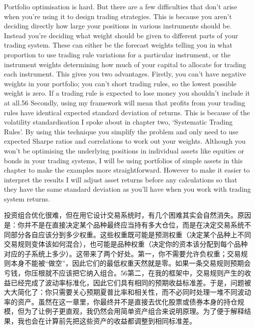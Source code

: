 
\begin{englishblock} Portfolio optimisation is hard. But there are a few difficulties that don't arise when you're using it to design trading strategies. This is because you aren't deciding directly how large your positions in various instruments should be. Instead you're deciding what weight should be given to different parts of your trading system. These can either be the forecast weights telling you in what proportion to use trading rule variations for a particular instrument, or the instrument weights determining how much of your capital to allocate for trading each instrument. This gives you two advantages. Firstly, you can't have negative weights in your portfolio; you can't short trading rules, so the lowest possible weight is zero. If a trading rule is expected to lose money you shouldn't include it at all.56 Secondly, using my framework will mean that profits from your trading rules have identical expected standard deviation of returns. This is because of the volatility standardisation I spoke about in chapter two, ‘Systematic Trading Rules'. By using this technique you simplify the problem and only need to use expected Sharpe ratios and correlations to work out your weights. Although you won't be optimising the underlying positions in individual assets like equities or bonds in your trading systems, I will be using portfolios of simple assets in this chapter to make the examples more straightforward. However to make it easier to interpret the results I will adjust asset returns before any calculations so that they have the same standard deviation as you'll have when you work with trading system returns. \end{englishblock}

\begin{chineseblock}投资组合优化很难，但在用它设计交易系统时，有几个困难其实会自然消失。原因是：你并不是在直接决定某个品种最终应当持有多大仓位，而是在决定交易系统不同部分各自应该分到多少权重。这些权重既可能是预测权重（决定某个品种上不同交易规则变体该如何混合），也可能是品种权重（决定你的资本该分配到每个品种对应的子系统上多少）。这带来了两个好处。第一，你不需要允许负权重；交易规则本身不能被“做空”，因此它们的最低权重天然就是零。如果一条交易规则预期会亏钱，你压根就不应该把它纳入组合。56第二，在我的框架中，交易规则产生的收益已经完成了波动率标准化，因此它们具有相同的预期收益标准差。于是，问题被大大简化了：你只需要关心预期夏普比率和相关性，而不必同时处理一堆不同波动率的资产。虽然在这一章里，你最终并不是直接去优化股票或债券本身的持仓规模，但为了让例子更直观，我仍然会用简单资产组合来说明原理。为了便于解释结果，我也会在计算前先把这些资产的收益都调整到相同标准差。\end{chineseblock}

